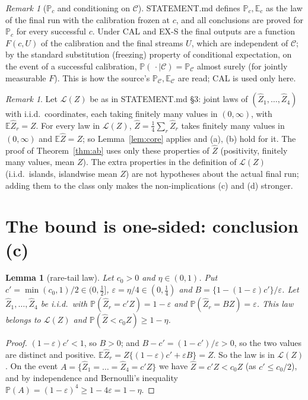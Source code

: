 \documentclass[11pt]{article}
\newtheorem{lemma}[theorem]{Lemma}
\theoremstyle{remark}
\newtheorem{remark}[theorem]{Remark}
\newcommand{\Zh}{\widehat Z}
\newcommand{\Pc}{\mathbb{P}_c}
\newcommand{\Ec}{\mathbb{E}_c}
\newcommand{\cL}{\mathcal{L}}
\begin{document}
\begin{remark}[$\Pc$ and conditioning on $\mathcal C$]\label{rem:cond}
STATEMENT.md defines $\Pc,\Ec$ as the law of the final run with the calibration frozen at $c$, and all conclusions are
proved for $\Pc$ for every successful $c$. Under CAL and EX-S the final outputs are a function $F(c,U)$ of the
calibration and the final streams $U$, which are independent of $\mathcal C$; by the standard substitution (freezing)
property of conditional expectation, on the event of a successful calibration,
$\mathbb{P}(\,\cdot\mid\mathcal C)=\mathbb{P}_{\mathcal C}$ almost surely (for jointly measurable $F$). This is how the
source's $\mathbb{P}_{\mathcal C},\mathbb{E}_{\mathcal C}$ are read; CAL is used only here.
\end{remark}

\begin{remark}\label{rem:class}
Let $\cL(Z)$ be as in STATEMENT.md \S3: joint laws of $(\Zh_1,\dots,\Zh_4)$ with i.i.d.\ coordinates, each taking finitely
many values in $(0,\infty)$, with $\mathbb{E}\Zh_r=Z$. For every law in $\cL(Z)$, $\Zh=\frac14\sum_r\Zh_r$ takes finitely
many values in $(0,\infty)$ and $\mathbb{E}\Zh=Z$; so Lemma~\ref{lem:core} applies and (a), (b) hold for it. The proof of
Theorem~\ref{thm:ab} uses only these properties of $\Zh$ (positivity, finitely many values, mean $Z$). The extra
properties in the definition of $\cL(Z)$ (i.i.d.\ islands, islandwise mean $Z$) are not hypotheses about the actual final
run; adding them to the class only makes the non-implications (c) and (d) stronger.
\end{remark}

\section{The bound is one-sided: conclusion (c)}

\begin{lemma}[rare-tail law]\label{lem:rare}
Let $c_0>0$ and $\eta\in(0,1)$. Put $c'=\min(c_0,1)/2\in(0,\tfrac12]$, $\varepsilon=\eta/4\in(0,\tfrac14)$ and
$B=\{1-(1-\varepsilon)c'\}/\varepsilon$. Let $\Zh_1,\dots,\Zh_4$ be i.i.d.\ with $\mathbb{P}(\Zh_r=c'Z)=1-\varepsilon$ and
$\mathbb{P}(\Zh_r=BZ)=\varepsilon$. This law belongs to $\cL(Z)$ and $\mathbb{P}(\Zh<c_0Z)\ge1-\eta$.
\end{lemma}

\begin{proof}
$(1-\varepsilon)c'<1$, so $B>0$; and $B-c'=(1-c')/\varepsilon>0$, so the two values are distinct and positive.
$\mathbb{E}\Zh_r=Z\{(1-\varepsilon)c'+\varepsilon B\}=Z$. So the law is in $\cL(Z)$. On the event
$A=\{\Zh_1=\dots=\Zh_4=c'Z\}$ we have $\Zh=c'Z<c_0Z$ (as $c'\le c_0/2$), and by independence and Bernoulli's inequality
$\mathbb{P}(A)=(1-\varepsilon)^4\ge1-4\varepsilon=1-\eta$.
\end{proof}
\end{document}
